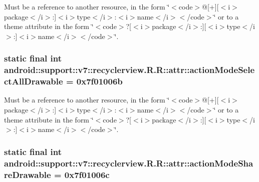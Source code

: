 Must be a reference to another resource, in the form \char`\"{}$<$code$>$@\mbox{[}+\mbox{]}\mbox{[}$<$i$>$package$<$/i$>$:\mbox{]}$<$i$>$type$<$/i$>$:$<$i$>$name$<$/i$>$$<$/code$>$\char`\"{} or to a theme attribute in the form \char`\"{}$<$code$>$?\mbox{[}$<$i$>$package$<$/i$>$:\mbox{]}\mbox{[}$<$i$>$type$<$/i$>$:\mbox{]}$<$i$>$name$<$/i$>$$<$/code$>$\char`\"{}. \hypertarget{classandroid_1_1support_1_1v7_1_1recyclerview_1_1_r_1_1attr_eae466a3b0ac5608391ad1afa1600d59}{
\subsubsection[{actionModeSelectAllDrawable}]{\setlength{\rightskip}{0pt plus 5cm}static final int android::support::v7::recyclerview.R.R::attr::actionModeSelectAllDrawable = 0x7f01006b}}
\label{classandroid_1_1support_1_1v7_1_1recyclerview_1_1_r_1_1attr_eae466a3b0ac5608391ad1afa1600d59}


Must be a reference to another resource, in the form \char`\"{}$<$code$>$@\mbox{[}+\mbox{]}\mbox{[}$<$i$>$package$<$/i$>$:\mbox{]}$<$i$>$type$<$/i$>$:$<$i$>$name$<$/i$>$$<$/code$>$\char`\"{} or to a theme attribute in the form \char`\"{}$<$code$>$?\mbox{[}$<$i$>$package$<$/i$>$:\mbox{]}\mbox{[}$<$i$>$type$<$/i$>$:\mbox{]}$<$i$>$name$<$/i$>$$<$/code$>$\char`\"{}. \hypertarget{classandroid_1_1support_1_1v7_1_1recyclerview_1_1_r_1_1attr_1c45584ab54005db06aec7311f643ffb}{
\subsubsection[{actionModeShareDrawable}]{\setlength{\rightskip}{0pt plus 5cm}static final int android::support::v7::recyclerview.R.R::attr::actionModeShareDrawable = 0x7f01006c}}
\label{classandroid_1_1support_1_1v7_1_1recyclerview_1_1_r_1_1attr_1c45584ab54005db06aec7311f643ffb}


